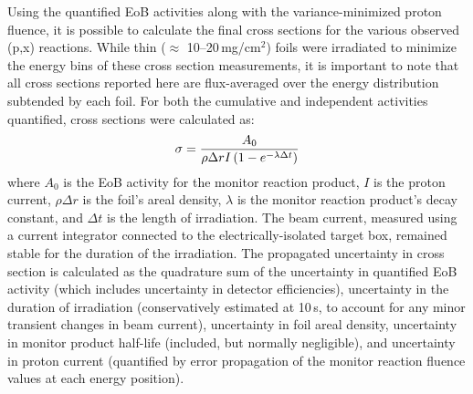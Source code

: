 Using the quantified EoB activities along with the variance-minimized proton fluence, it is possible to calculate the final cross sections for the various observed (p,x) reactions.
While thin ($\approx$ 10--20\,mg/cm$^2$)  foils were irradiated to minimize the energy bins of these cross section measurements, it is important to note that all cross sections reported here are flux-averaged  
over the energy distribution subtended by each foil.
For both the cumulative and independent activities quantified, cross sections were calculated as:
\begin{equation}
\sigma = \dfrac{A_0 }{\rho \Delta r I \left( 1-e^{-\lambda \Delta t}\right) }
\end{equation}
where $A_0$ is the EoB activity for the monitor reaction product, $I$ is the proton current, $\rho \Delta r$ is the foil's areal density, $\lambda$ is the monitor reaction product's decay constant, and $\Delta t$ is the length of irradiation.
The beam current, measured using a current integrator connected to the electrically-isolated target box, remained stable for the duration of the irradiation.
The propagated uncertainty in cross section is calculated as the quadrature sum of the uncertainty in quantified EoB activity (which includes uncertainty in detector efficiencies), uncertainty in the duration of irradiation (conservatively estimated at 10\,s, to account for any minor transient changes in beam current), uncertainty in foil areal density, uncertainty in monitor product half-life (included, but normally negligible),  and uncertainty in proton current (quantified by error propagation of the monitor reaction fluence values  at each energy position).




